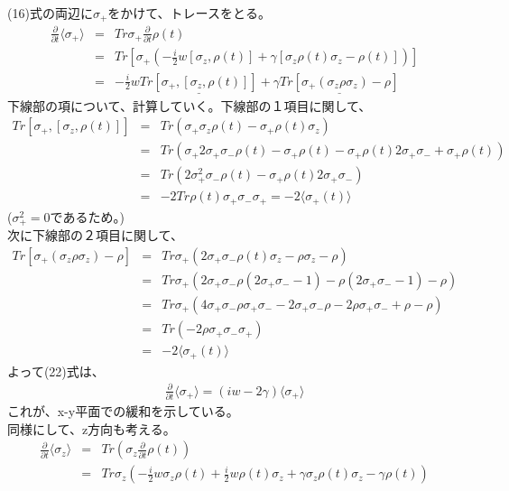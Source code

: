 \documentclass[10pt]{jreport}
\begin{document}
(16)式の両辺に$\sigma_+$をかけて、トレースをとる。\\
\begin{eqnarray}
\frac{\partial}{\partial t} \langle \sigma_+ \rangle &=& Tr\sigma_+\frac{\partial}{\partial t} \rho(t) \nonumber \\
&=& Tr[\sigma_+(-\frac{i}{2}w[\sigma_z,\rho(t)]+\gamma[\sigma_z \rho(t) \sigma_z-\rho(t)])] \nonumber \\
&=& -\frac{i}{2}w \underline{Tr[\sigma_+,[\sigma_z,\rho(t)]]}+\gamma \underline{Tr[\sigma_+(\sigma_z \rho \sigma_z)-\rho]}
\end{eqnarray}
下線部の項について、計算していく。下線部の１項目に関して、\\
\begin{eqnarray}
Tr[\sigma_+,[\sigma_z,\rho(t)]] &=& Tr(\sigma_+ \sigma_z \rho(t)-\sigma_+ \rho(t) \sigma_z)\nonumber \\
&=& Tr(\sigma_+ 2 \sigma_+ \sigma_- \rho(t) -\sigma_+ \rho(t)-\sigma_+ \rho(t) 2\sigma_+ \sigma_- + \sigma_+ \rho(t)) \nonumber \\
&=& Tr(2\sigma_+^2 \sigma_- \rho(t)-\sigma_+ \rho(t)2\sigma_+\sigma_-) \nonumber \\
&=& -2Tr\rho(t)\sigma_+\sigma_- \sigma_+ =-2 \langle \sigma_+(t) \rangle 
\end{eqnarray}
($\sigma_+^2=0$であるため。)\\
次に下線部の２項目に関して、
\begin{eqnarray}
Tr[\sigma_+(\sigma_z \rho \sigma_z)-\rho] &=& Tr \sigma_+(2\sigma_+\sigma_-\rho(t) \sigma_z -\rho \sigma_z-\rho) \nonumber \\
&=& Tr\sigma_+(2\sigma_+ \sigma_- \rho(2\sigma_+ \sigma_- -1 )-\rho(2\sigma_+\sigma_- -1)-\rho) \nonumber \\
&=& Tr \sigma_+(4\sigma_+\sigma_- \rho \sigma_+ \sigma_- -2\sigma_+ \sigma_- \rho -2\rho \sigma_+\sigma_- +\rho -\rho) \nonumber \\
&=& Tr(-2\rho \sigma_+\sigma_-\sigma_+) \nonumber \\
&=& -2 \langle \sigma_+(t) \rangle 
\end{eqnarray}
よって(22)式は、
\begin{eqnarray}
\frac{\partial}{\partial t} \langle \sigma_+ \rangle =(iw -2\gamma)\langle \sigma_+\rangle
\end{eqnarray}
これが、x-y平面での緩和を示している。\\
同様にして、z方向も考える。\\
\begin{eqnarray}
\frac{\partial}{\partial t} \langle \sigma_z \rangle &=& Tr(\sigma_z \frac{\partial}{\partial t}\rho(t)) \nonumber \\
&=& Tr \sigma_z (-\frac{i}{2}w\sigma_z \rho(t)+\frac{i}{2}w \rho(t) \sigma_z+\gamma\sigma_z\rho(t) \sigma_z -\gamma \rho(t)) \nonumber 
\end{eqnarray}
\end{document}
